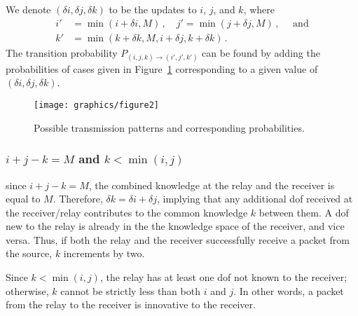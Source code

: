 We denote $(\delta i,\delta j,\delta k)$ to be the updates to $i$, $j$, and $k$, where
\begin{align*}
i' &=\min(i+\delta i, M)\,, \quad j' = \min(j + \delta j, M)\,, \quad \text{ and}\\
k' &= \min(k+\delta k,M,i+ \delta j, k + \delta k)\,.
 \end{align*}
 The transition probability $P_{(i,j,k) \rightarrow (i',j',k')}$ can be found by adding the probabilities of cases given in Figure~\ref{fig:statetransitions} corresponding to a given value of $(\delta i,\delta j,\delta k)$.

\begin{figure}[tbp]
\begin{center}
\texttt{[image: graphics/figure2]}
\caption{Possible transmission patterns and corresponding probabilities.}
\label{fig:statetransitions}\vspace*{-.4cm}
\end{center}
\end{figure}

\subsubsection{$i+j-k=M$ and $k<\min(i,j)$}\label{sec:case_a} since $i+j-k=M$, the combined knowledge at the relay and the receiver is equal to $M$. Therefore, $\delta k = \delta i + \delta j$, implying that any additional dof received at the receiver/relay contributes to the common knowledge $k$ between them.
A dof new to the relay is already in the the knowledge space of the receiver, and vice versa. Thus, if both the relay and the receiver successfully receive a packet from the source, $k$ increments by two. 

Since $k < \min(i, j)$, the relay has at least one dof not known to the receiver; otherwise, $k$ cannot be strictly less than both $i$ and $j$. In other words, a packet from the relay to the receiver is innovative to the receiver.



